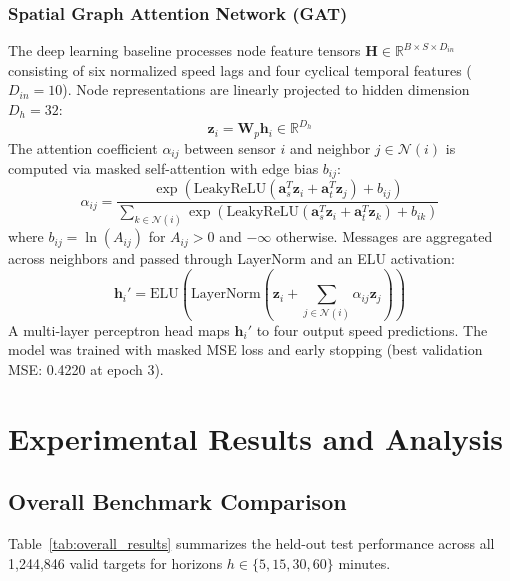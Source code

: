 \documentclass[conference]{IEEEtran}
\begin{document}
\subsubsection{Spatial Graph Attention Network (GAT)}
The deep learning baseline processes node feature tensors $\mathbf{H} \in \mathbb{R}^{B \times S \times D_{in}}$ consisting of six normalized speed lags and four cyclical temporal features ($D_{in} = 10$). Node representations are linearly projected to hidden dimension $D_h = 32$:
\begin{equation}
\mathbf{z}_i = \mathbf{W}_p \mathbf{h}_i \in \mathbb{R}^{D_h}
\end{equation}
The attention coefficient $\alpha_{ij}$ between sensor $i$ and neighbor $j \in \mathcal{N}(i)$ is computed via masked self-attention with edge bias $b_{ij}$:
\begin{equation}
\alpha_{ij} = \frac{\exp\left( \text{LeakyReLU}\left( \mathbf{a}_s^T \mathbf{z}_i + \mathbf{a}_t^T \mathbf{z}_j \right) + b_{ij} \right)}{\sum_{k \in \mathcal{N}(i)} \exp\left( \text{LeakyReLU}\left( \mathbf{a}_s^T \mathbf{z}_i + \mathbf{a}_t^T \mathbf{z}_k \right) + b_{ik} \right)}
\end{equation}
where $b_{ij} = \ln(A_{ij})$ for $A_{ij} > 0$ and $-\infty$ otherwise. Messages are aggregated across neighbors and passed through LayerNorm and an ELU activation:
\begin{equation}
\mathbf{h}_i' = \text{ELU}\left( \text{LayerNorm}\left( \mathbf{z}_i + \sum_{j \in \mathcal{N}(i)} \alpha_{ij} \mathbf{z}_j \right) \right)
\end{equation}
A multi-layer perceptron head maps $\mathbf{h}_i'$ to four output speed predictions. The model was trained with masked MSE loss and early stopping (best validation MSE: 0.4220 at epoch 3).

\section{Experimental Results and Analysis}

\subsection{Overall Benchmark Comparison}
Table~\ref{tab:overall_results} summarizes the held-out test performance across all 1,244,846 valid targets for horizons $h \in \{5, 15, 30, 60\}$ minutes.
\end{document}
